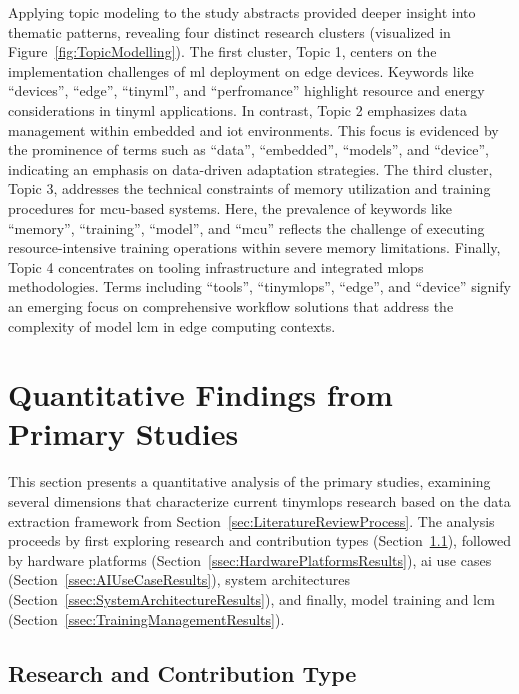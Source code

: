 Applying topic modeling to the study abstracts provided deeper insight into thematic patterns, revealing four distinct research clusters (visualized in Figure~\ref{fig:TopicModelling}). The first cluster, Topic 1, centers on the implementation challenges of \gls{ml} deployment on edge devices. Keywords like ``devices'', ``edge'', ``\gls{tinyml}'', and ``perfromance'' highlight resource and energy considerations in \gls{tinyml} applications. In contrast, Topic 2 emphasizes data management within embedded and \gls{iot} environments. This focus is evidenced by the prominence of terms such as ``data'', ``embedded'', ``models'', and ``device'', indicating an emphasis on data-driven adaptation strategies.
The third cluster, Topic 3, addresses the technical constraints of memory utilization and training procedures for \gls{mcu}-based systems. Here, the prevalence of keywords like ``memory'', ``training'', ``model'', and ``\gls{mcu}'' reflects the challenge of executing resource-intensive training operations within severe memory limitations. Finally, Topic 4 concentrates on tooling infrastructure and integrated \gls{mlops} methodologies. Terms including ``tools'', ``\gls{tinymlops}'', ``edge'', and ``device'' signify an emerging focus on comprehensive workflow solutions that address the complexity of model \gls{lcm} in edge computing contexts.

\section{Quantitative Findings from Primary Studies}
\label{sec:QuantitativeFindingsResults}

This section presents a quantitative analysis of the primary studies, examining several dimensions that characterize current \gls{tinymlops} research based on the data extraction framework from Section~\ref{sec:LiteratureReviewProcess}. The analysis proceeds by first exploring research and contribution types (Section~\ref{ssec:ResearchContributionTypeResults}), followed by hardware platforms (Section~\ref{ssec:HardwarePlatformsResults}), \gls{ai} use cases (Section~\ref{ssec:AIUseCaseResults}), system architectures (Section~\ref{ssec:SystemArchitectureResults}), and finally, model training and \gls{lcm} (Section~\ref{ssec:TrainingManagementResults}).

\subsection{Research and Contribution Type}
\label{ssec:ResearchContributionTypeResults}

